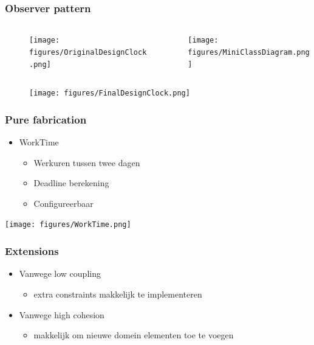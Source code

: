 \documentclass{beamer}
\begin{document}
\begin{frame}
\frametitle {Observer pattern}
\vspace{-0.5cm}
\begin{columns}
    \begin{column}{.58\paperwidth}
        \begin{figure}
            \texttt{[image: figures/OriginalDesignClock.png]}
        \end{figure}
    \end{column}
    \begin{column}{.3\paperwidth}
        \texttt{[image: figures/MiniClassDiagram.png]}
    \end{column}
\end{columns}
\vspace{-0.2cm}
\begin{figure}
    \texttt{[image: figures/FinalDesignClock.png]}
\end{figure}
\end{frame}

%

\begin{frame}
\frametitle{Pure fabrication}
\begin{itemize}
\item WorkTime
\begin{itemize}
\item Werkuren tussen twee dagen 
\item Deadline berekening
\item Configureerbaar
\end{itemize}
\end{itemize}
\texttt{[image: figures/WorkTime.png]}
\end{frame}

%

\begin{frame}
\frametitle{Extensions}
\begin{itemize}
\item Vanwege low coupling
\begin{itemize}
\item extra constraints makkelijk te implementeren
\end{itemize}
\item Vanwege high cohesion
\begin{itemize}
\item makkelijk om nieuwe domein elementen toe te voegen
\end{itemize}
\end{itemize}
\end{frame}
\end{document}
